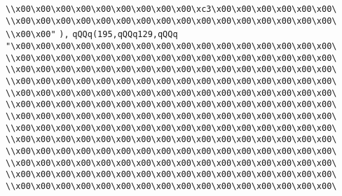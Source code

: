 \verb|\\x00\x00\x00\x00\x00\x00\x00\x00\x00\xc3\x00\x00\x00\x00\x00\x00\|\newline
\verb|\\x00\x00\x00\x00\x00\x00\x00\x00\x00\x00\x00\x00\x00\x00\x00\x00\|\newline
\verb|\\x00\x00"|\newline
\verb|),|\newline
\verb|qQQq(195,qQQq129,qQQq|\newline
\verb|"\x00\x00\x00\x00\x00\x00\x00\x00\x00\x00\x00\x00\x00\x00\x00\x00\|\newline
\verb|\\x00\x00\x00\x00\x00\x00\x00\x00\x00\x00\x00\x00\x00\x00\x00\x00\|\newline
\verb|\\x00\x00\x00\x00\x00\x00\x00\x00\x00\x00\x00\x00\x00\x00\x00\x00\|\newline
\verb|\\x00\x00\x00\x00\x00\x00\x00\x00\x00\x00\x00\x00\x00\x00\x00\x00\|\newline
\verb|\\x00\x00\x00\x00\x00\x00\x00\x00\x00\x00\x00\x00\x00\x00\x00\x00\|\newline
\verb|\\x00\x00\x00\x00\x00\x00\x00\x00\x00\x00\x00\x00\x00\x00\x00\x00\|\newline
\verb|\\x00\x00\x00\x00\x00\x00\x00\x00\x00\x00\x00\x00\x00\x00\x00\x00\|\newline
\verb|\\x00\x00\x00\x00\x00\x00\x00\x00\x00\x00\x00\x00\x00\x00\x00\x00\|\newline
\verb|\\x00\x00\x00\x00\x00\x00\x00\x00\x00\x00\x00\x00\x00\x00\x00\x00\|\newline
\verb|\\x00\x00\x00\x00\x00\x00\x00\x00\x00\x00\x00\x00\x00\x00\x00\x00\|\newline
\verb|\\x00\x00\x00\x00\x00\x00\x00\x00\x00\x00\x00\x00\x00\x00\x00\x00\|\newline
\verb|\\x00\x00\x00\x00\x00\x00\x00\x00\x00\x00\x00\x00\x00\x00\x00\x00\|\newline
\verb|\\x00\x00\x00\x00\x00\x00\x00\x00\x00\x00\x00\x00\x00\x00\x00\x00\|\newline
